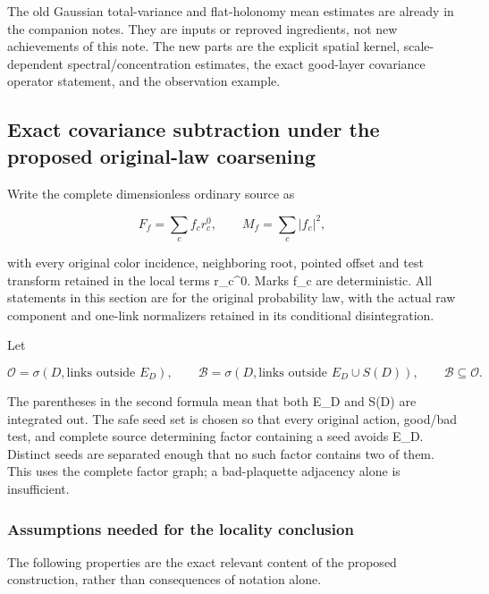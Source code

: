 \documentclass[
  11pt,
]{article}
\begin{document}
The old Gaussian total-variance and flat-holonomy mean estimates are
already in the companion notes. They are inputs or reproved
ingredients, not new achievements of this note. The new parts are the
explicit spatial kernel, scale-dependent spectral/concentration
estimates, the exact good-layer covariance operator statement, and the
observation example.

\hypertarget{exact-covariance-subtraction-under-the-proposed-original-law-coarsening}{%
\subsection{Exact covariance subtraction under the proposed original-law
coarsening}\label{exact-covariance-subtraction-under-the-proposed-original-law-coarsening}}

Write the complete dimensionless ordinary source as

\[
 F_f=\sum_c f_c r_c^0,\qquad M_f=\sum_c|f_c|^2,
\]

with every original color incidence, neighboring root, pointed offset
and test transform retained in the local terms r\_c\^{}0. Marks f\_c are
deterministic. All statements in this section are for the original
probability law, with the actual raw component and one-link normalizers
retained in its conditional disintegration.

Let

\[
 \mathcal O=\sigma(D,\text{links outside }E_D),\qquad
 \mathcal B=\sigma(D,\text{links outside }E_D\cup S(D)),
 \qquad \mathcal B\subseteq\mathcal O.
\]

The parentheses in the second formula mean that both E\_D and S(D) are
integrated out. The safe seed set is chosen so that every original
action, good/bad test, and complete source determining factor containing
a seed avoids E\_D. Distinct seeds are separated enough that no such
factor contains two of them. This uses the complete factor graph; a
bad-plaquette adjacency alone is insufficient.

\hypertarget{assumptions-needed-for-the-locality-conclusion}{%
\subsubsection{Assumptions needed for the locality
conclusion}\label{assumptions-needed-for-the-locality-conclusion}}

The following properties are the exact relevant content of the proposed
construction, rather than consequences of notation alone.
\end{document}
